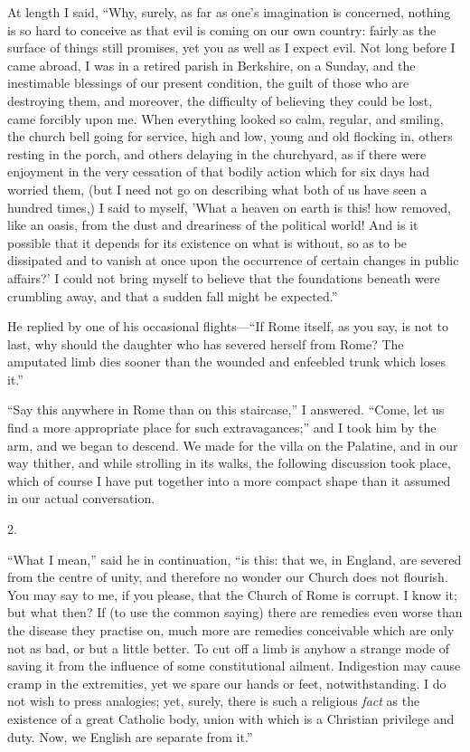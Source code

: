At length I said, ``Why, surely, as far as one's
imagination is concerned, nothing is so hard to conceive as that evil
is coming on our own country: fairly as the surface of things still
promises, yet you as well as I expect evil. Not long before I came
abroad, I was in a retired parish in Berkshire, on a Sunday, and the
inestimable blessings of our present condition, the guilt of those
who are destroying them, and moreover, the difficulty of believing
they could be lost, came forcibly upon me. When everything looked so
calm, regular, and smiling, the church bell going for service, high
and low, young and old flocking in, others resting in the porch, and
others delaying in the churchyard, as if there were enjoyment in the
very cessation of that bodily action which for six days had worried
them, (but I need not go on describing what both of us have seen a
hundred times,) I said to myself, 'What a heaven on earth is this! how
removed, like an oasis, from the dust and dreariness of the political
world! And is it possible that it depends for its existence on what is
without, so as to be dissipated and to vanish at once upon the
occurrence of certain changes in public affairs?' I could not bring
myself to believe that the foundations beneath were crumbling away,
and that a sudden fall might be expected.''

He replied by one of his occasional flights—``If
Rome itself, as you say, is not to last, why should the daughter who
has severed herself from Rome? The amputated limb dies sooner than the
wounded and enfeebled trunk which loses it.''

``Say this anywhere in Rome than on this
staircase,'' I answered. ``Come, let us find a more appropriate place
for such extravagances;'' and I took him by the arm, and we began to
descend. We made for the villa on the Palatine, and in our way
thither, and while strolling in its walks, the following discussion
took place, which of course I have put together into a more compact
shape than it assumed in our actual conversation.

2.

``What I mean,'' said he in continuation, ``is
this: that we, in England, are severed from the centre of unity, and
therefore no wonder our Church does not flourish. You may say to
me, if you please, that the Church of Rome is corrupt. I know it; but
what then? If (to use the common saying) there are remedies even worse
than the disease they practise on, much more are remedies conceivable
which are only not as bad, or but a little better. To cut off a limb
is anyhow a strange mode of saving it from the influence of some
constitutional ailment. Indigestion may cause cramp in the
extremities, yet we spare our hands or feet, notwithstanding. I do not
wish to press analogies; yet, surely, there is such a religious \emph{fact}
as the existence of a great Catholic body, union with which is a
Christian privilege and duty. Now, we English are separate from it.''

